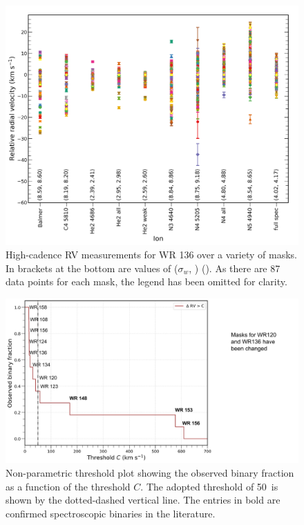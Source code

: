 \begin{figure}
    \centering
    \includegraphics[width=\hsize]{chapters/WNL/image/RV_SC_WR136_ion.png}
    \caption{High-cadence RV measurements for WR 136 over a variety of masks. In brackets at the bottom are values of ($\sigma_w$, \sigRV{}) (\kms{}). As there are 87 data points for each mask, the legend has been omitted for clarity. }
    \label{fig:hc_wr136}
\end{figure}

\label{sect:obsbinfrac}
\begin{figure}
    \centering
    \includegraphics[width=\hsize]{chapters/WNL/image/BINFRAC_WNL_2604.pdf}
    \caption{Non-parametric threshold plot showing the observed binary fraction as a function of the threshold $C$. The adopted threshold of 50\,\kms{} is shown by the dotted-dashed vertical line. The entries in bold are confirmed spectroscopic binaries in the literature.}
    \label{fig:threshold_plot}
\end{figure}

